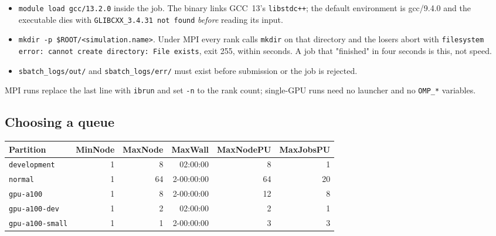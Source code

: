 \documentclass[11pt,a4paper]{article}
\newcommand{\code}[1]{\texttt{\small #1}}
\begin{document}
\begin{itemize}[nosep]
  \item \code{module load gcc/13.2.0} inside the job. The binary links GCC~13's
        \code{libstdc++}; the default environment is gcc/9.4.0 and the executable dies
        with \code{GLIBCXX\_3.4.31 not found} \emph{before} reading its input.
  \item \code{mkdir -p \$ROOT/<simulation.name>}. Under MPI every rank calls
        \code{mkdir} on that directory and the losers abort with
        \code{filesystem error: cannot create directory: File exists}, exit 255, within
        seconds. A job that "finished" in four seconds is this, not speed.
  \item \code{sbatch\_logs/out/} and \code{sbatch\_logs/err/} must exist before
        submission or the job is rejected.
\end{itemize}

MPI runs replace the last line with \code{ibrun} and set \code{-n} to the rank count;
single-GPU runs need no launcher and no \code{OMP\_*} variables.

\subsection{Choosing a queue}
\label{sec:queues}

\begin{center}\small
\begin{tabular}{@{}lrrrrr@{}}
\toprule
Partition & MinNode & MaxNode & MaxWall & MaxNodePU & MaxJobsPU \\
\midrule
\code{development}    & 1 & 8   & 02:00:00   & 8  & 1  \\
\code{normal}         & 1 & 64  & 2-00:00:00 & 64 & 20 \\
\code{gpu-a100}       & 1 & 8   & 2-00:00:00 & 12 & 8  \\
\code{gpu-a100-dev}   & 1 & 2   & 02:00:00   & 2  & 1  \\
\code{gpu-a100-small} & 1 & 1   & 2-00:00:00 & 3  & 3  \\
\bottomrule
\end{tabular}
\end{center}
\end{document}

